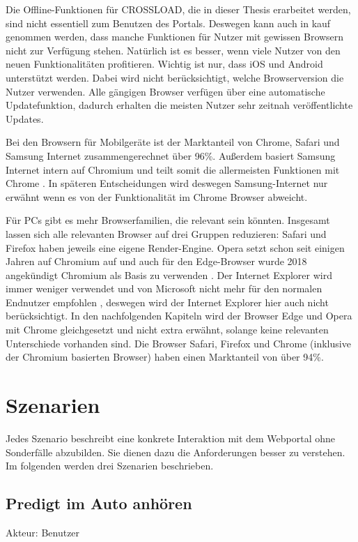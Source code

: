 Die Offline-Funktionen für CROSSLOAD, die in dieser Thesis erarbeitet werden, sind nicht essentiell zum Benutzen des Portals. Deswegen kann auch in kauf genommen werden, dass manche Funktionen für Nutzer mit gewissen Browsern nicht zur Verfügung stehen. Natürlich ist es besser, wenn viele Nutzer von den neuen Funktionalitäten profitieren. Wichtig ist nur, dass iOS und Android unterstützt werden. Dabei wird nicht berücksichtigt, welche Browserversion die Nutzer verwenden. Alle gängigen Browser verfügen über eine automatische Updatefunktion, dadurch erhalten die meisten Nutzer sehr zeitnah veröffentlichte Updates.

Bei den Browsern für Mobilgeräte ist der Marktanteil von Chrome, Safari und Samsung Internet zusammengerechnet über 96\%. Außerdem basiert Samsung Internet intern auf Chromium und teilt somit die allermeisten Funktionen mit Chrome \autocite{samsung-webkit}. In späteren Entscheidungen wird deswegen Samsung-Internet nur erwähnt wenn es von der Funktionalität im Chrome Browser abweicht.

Für PCs gibt es mehr Browserfamilien, die relevant sein könnten. Insgesamt lassen sich alle relevanten Browser auf drei Gruppen reduzieren: Safari und Firefox haben jeweils eine eigene Render-Engine. Opera setzt schon seit einigen Jahren auf Chromium auf \autocite{opera-webkit} und auch für den Edge-Browser wurde 2018 angekündigt Chromium als Basis zu verwenden \autocite{edge-faq}. Der Internet Explorer wird immer weniger verwendet und von Microsoft nicht mehr für den normalen Endnutzer empfohlen \autocite{edge-faq}, deswegen wird der Internet Explorer hier auch nicht berücksichtigt. In den nachfolgenden Kapiteln wird der Browser Edge und Opera mit Chrome gleichgesetzt und nicht extra erwähnt, solange keine relevanten Unterschiede vorhanden sind. Die Browser Safari, Firefox und Chrome (inklusive der Chromium basierten Browser) haben einen Marktanteil von über 94\%.

\section{Szenarien}
Jedes Szenario beschreibt eine konkrete Interaktion mit dem Webportal ohne Sonderfälle abzubilden. Sie dienen dazu die Anforderungen besser zu verstehen. Im folgenden werden drei Szenarien beschrieben.

\subsection{Predigt im Auto anhören}
Akteur: Benutzer

